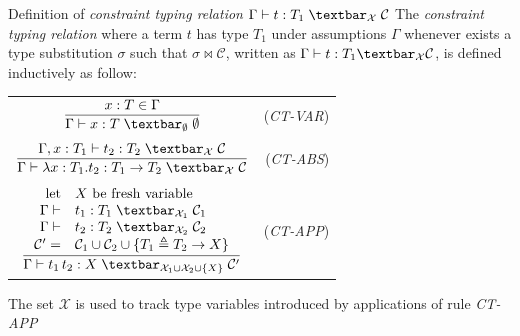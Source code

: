 \documentclass[8pt]{beamer}
\begin{document}
\begin{frame}
    \begin{block}{Definition of \emph{constraint typing relation} 
            $\Gamma \vdash t : T_1 \; \textbar_\mathcal{X} \; \mathcal{C}$}
        The \emph{constraint typing relation} where a term $t$ has type
            $T_1$ under assumptions $\Gamma$ 
            whenever exists a type substitution $\sigma$ such that 
            $\sigma \Join \mathcal{C}$, written as
            $\Gamma \vdash t : T_1 \textbar_\mathcal{X} \mathcal{C}$,
            is defined inductively as follow:
            \begin{center}
                \begin{tabular}{ c r }
                        $\displaystyle {{x:T \in \Gamma}\over
                        {\Gamma \vdash x:T \; \textbar_{\emptyset}\;  \emptyset}} $ 
                            & (\emph{CT-VAR}) \\ 
                   & \\
                   $\displaystyle{{\Gamma, x:T_{1} \vdash t_{2}:T_{2}\;
                    \textbar_{\mathcal{X}} \; \mathcal{C} }\over
                        {\Gamma \vdash \lambda x:T_{1}.t_{2} : T_{1} 
                            \rightarrow T_{2}\;
                    \textbar_{\mathcal{X}} \; \mathcal{C} }} $ & (\emph{CT-ABS}) \\
                   & \\ 
                   ${\displaystyle{{{
                        \begin{array}{rl}
                         \text{let} & X \text{ be fresh variable} \\
                        \Gamma \vdash & t_{1}:T_{1} \; \textbar_{\mathcal{X}_1} \;
                            \mathcal{C}_1  \\
                        \Gamma \vdash & t_{2}:T_{2} \; \textbar_{\mathcal{X}_2} \;
                            \mathcal{C}_2  \\
                         \mathcal{C}^{\prime} = & \mathcal{C}_1 \cup \mathcal{C}_2
                            \cup \{ T_1 \triangleq T_2 \rightarrow X \}
                        \end{array}}\over
                        {\Gamma \vdash t_{1} \, t_{2} : X\;
                    \textbar_{\mathcal{X}_1 \cup \mathcal{X}_2 \cup
                        \{X\}} \; \mathcal{C}^{\prime} }}}} $ & (\emph{CT-APP}) \\
                \end{tabular}
            \end{center}
        The set $\mathcal{X}$ is used to track type variables introduced
            by applications of rule \emph{CT-APP}
    \end{block}
\end{frame}
\end{document}
